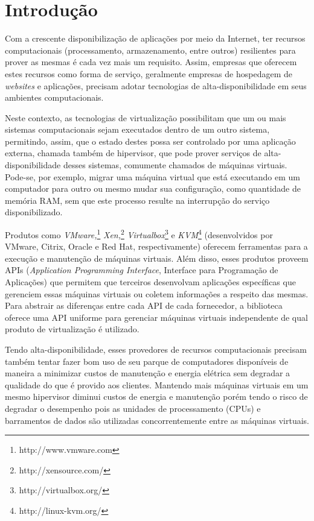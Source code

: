 %
%

\chapter{Introdução}

Com a crescente disponibilização de aplicações por meio da Internet, ter
recursos computacionais (processamento, armazenamento, entre outros)
resilientes para prover as mesmas é cada vez mais um requisito. Assim,
empresas que oferecem estes recursos como forma de serviço, geralmente
empresas de hospedagem de \emph{websites} e aplicações, precisam adotar
tecnologias de alta-disponibilidade em seus ambientes computacionais.

Neste contexto, as tecnologias de virtualização possibilitam que um ou mais
sistemas computacionais sejam executados dentro de um outro sistema,
permitindo, assim, que o estado destes possa ser controlado por uma aplicação
externa, chamada também de hipervisor, que pode prover serviços de
alta-disponibilidade desses sistemas, comumente chamados de máquinas
virtuais. Pode-se, por exemplo, migrar uma máquina virtual que está
executando em um computador para outro ou mesmo mudar sua configuração,
como quantidade de memória RAM, sem que este processo resulte na
interrupção do serviço disponibilizado.

Produtos como \emph{VMware,}\footnote{http://www.vmware.com}
\emph{Xen,}\footnote{http://xensource.com/}
\emph{Virtualbox}\footnote{http://virtualbox.org/} e
\emph{KVM}\footnote{http://linux-kvm.org/} (desenvolvidos por VMware,
Citrix, Oracle e Red Hat, respectivamente) oferecem ferramentas para a
execução e manutenção de máquinas virtuais. Além disso, esses produtos
proveem APIs (\emph{Application Programming Interface}, Interface para Programação
de Aplicações) que permitem que terceiros desenvolvam aplicações
específicas que gerenciem essas máquinas virtuais ou coletem informações a
respeito das mesmas. Para abstrair as diferenças entre cada API de cada
fornecedor, a biblioteca \libvirt{} oferece uma API uniforme para gerenciar
máquinas virtuais independente de qual produto de virtualização é
utilizado.

Tendo alta-disponibilidade, esses provedores de recursos computacionais
precisam também tentar fazer bom uso de seu parque de computadores
disponíveis de maneira a  minimizar custos de manutenção e energia elétrica
sem degradar a qualidade do que é provido aos clientes. Mantendo mais
máquinas virtuais em um mesmo hipervisor diminui custos de energia e
manutenção porém tendo o risco de degradar o desempenho pois as unidades de
processamento (CPUs) e barramentos de dados são utilizadas concorrentemente
entre as máquinas virtuais.

